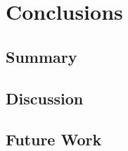 
\chapter{Conclusions}
\label{chap:chap5}

\section*{}


\section{Summary} %
\label{sec:summary}




\section{Discussion} %
\label{sec:discussion}



\section{Future Work} %
\label{sec:future_work}


